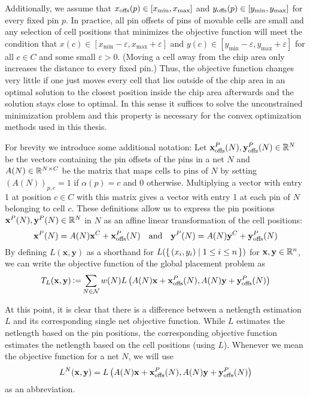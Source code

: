 Additionally, we assume that \(x_{\operatorname{offs}}(p) \in [x_{\min}, x_{\max}]\) and \(y_{\operatorname{offs}}(p) \in [y_{\min}, y_{\max}]\) for every fixed pin \(p\).
In practice, all pin offsets of pins of movable cells are small and
any selection of cell positions that minimizes the objective function will meet the condition 
that \(x(c) \in [x_{\min} - \varepsilon, x_{\max} + \varepsilon]\) and \(y(c) \in [y_{\min} - \varepsilon, y_{\max} + \varepsilon]\) 
for all \(c \in C\) and some small \(\varepsilon > 0\).
(Moving a cell away from the chip area only increases the distance to every fixed pin.)
Thus, the objective function changes very little if one just moves every cell
that lies outside of the chip area in an optimal solution
to the closest position inside the chip area afterwards and the solution stays close to optimal.
In this sense it suffices to solve the unconstrained minimization problem
and this property is necessary for the convex optimization methods used in this thesis.

For brevity we introduce some additional notation:
Let \(\mathbf{x}^P_{\operatorname{offs}}(N), \mathbf{y}^P_{\operatorname{offs}}(N) \in \mathbb{R}^N\) be the vectors containing the pin offsets of the pins in a net \(N\)
and \(A(N) \in \mathbb{R}^{N \times C}\) be the matrix that maps cells to pins of \(N\) by setting \((A(N))_{p, c} = 1\) if \(\alpha(p) = c\) and 0 otherwise.
Multiplying a vector with entry 1 at position \(c \in C\) with this matrix gives a vector with entry 1 at each pin of \(N\) belonging to cell \(c\).
These definitions allow us to express the pin positions \(\mathbf{x}^P(N), \mathbf{y}^P(N) \in \mathbb{R}^N\) in \(N\) 
as an affine linear transformation of the cell positions:
\[ \mathbf{x}^P(N) = A(N) \mathbf{x}^C + \mathbf{x}_{\operatorname{offs}}^P(N) \quad \text{and} \quad \mathbf{y}^P(N) = A(N) \mathbf{y}^C + \mathbf{y}_{\operatorname{offs}}^P(N) \]
By defining \(L(\mathbf{x}, \mathbf{y})\) as a shorthand for \(L(\set{ (x_i, y_i) | 1 \leq i \leq n })\) for \(\mathbf{x}, \mathbf{y} \in \mathbb{R}^n\),
we can write the objective function of the global placement problem as
\[T_L(\mathbf{x}, \mathbf{y}) \operatorname{\vcentcolon=} \sum_{N \in \mathcal{N}} w(N) L \left({A(N) \mathbf{x} + \mathbf{x}_{\operatorname{offs}}^P(N), A(N) \mathbf{y} + \mathbf{y}_{\operatorname{offs}}^P(N)}\right)\]

At this point, it is clear that there is a difference between a netlength estimation \(L\) and its corresponding single net objective function.
While \(L\) estimates the netlength based on the pin positions,
the corresponding objective function estimates the netlength based on the cell positions (using \(L\)).
Whenever we mean the objective function for a net \(N\), we will use
\[ L^N(\mathbf{x}, \mathbf{y}) = L \left({A(N) \mathbf{x} + \mathbf{x}_{\operatorname{offs}}^P(N), A(N) \mathbf{y} + \mathbf{y}_{\operatorname{offs}}^P(N)}\right) \]
as an abbreviation.



